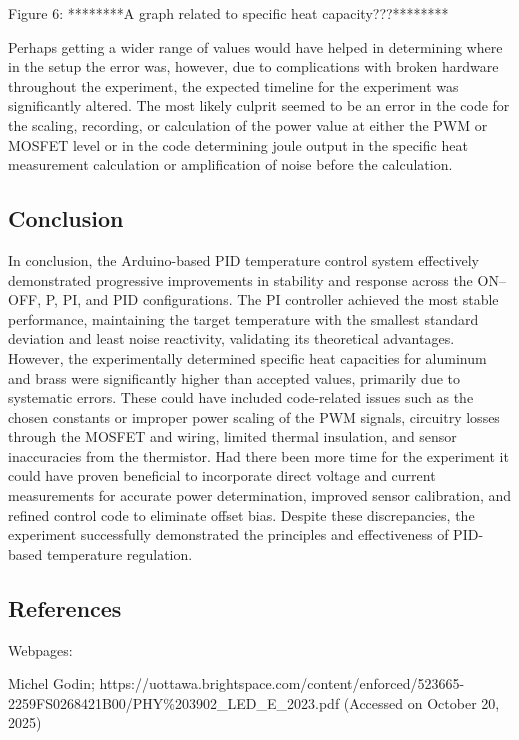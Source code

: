 \documentclass[11pt]{article}
\makeatletter
\newcommand{\boxspacing}{\kern\kvtcb@left@rule\kern\kvtcb@boxsep}
\newcommand{\prompt}[4]{
        {\ttfamily\llap{{\color{#2}[#3]:\hspace{3pt}#4}}\vspace{-\baselineskip}}
    }
\makeatother
\begin{document}
    Figure 6: ********A graph related to specific heat capacity???********

    Perhaps getting a wider range of values would have helped in determining
where in the setup the error was, however, due to complications with
broken hardware throughout the experiment, the expected timeline for the
experiment was significantly altered. The most likely culprit seemed to
be an error in the code for the scaling, recording, or calculation of
the power value at either the PWM or MOSFET level or in the code
determining joule output in the specific heat measurement calculation or
amplification of noise before the calculation.

    \hypertarget{conclusion}{%
\subsection{Conclusion}\label{conclusion}}

    In conclusion, the Arduino-based PID temperature control system
effectively demonstrated progressive improvements in stability and
response across the ON--OFF, P, PI, and PID configurations. The PI
controller achieved the most stable performance, maintaining the target
temperature with the smallest standard deviation and least noise
reactivity, validating its theoretical advantages. However, the
experimentally determined specific heat capacities for aluminum and
brass were significantly higher than accepted values, primarily due to
systematic errors. These could have included code-related issues such as
the chosen constants or improper power scaling of the PWM signals,
circuitry losses through the MOSFET and wiring, limited thermal
insulation, and sensor inaccuracies from the thermistor. Had there been
more time for the experiment it could have proven beneficial to
incorporate direct voltage and current measurements for accurate power
determination, improved sensor calibration, and refined control code to
eliminate offset bias. Despite these discrepancies, the experiment
successfully demonstrated the principles and effectiveness of PID-based
temperature regulation.

    \hypertarget{references}{%
\subsection{References}\label{references}}

    Webpages:

Michel Godin;
https://uottawa.brightspace.com/content/enforced/523665-2259FS0268421B00/PHY\%203902\_LED\_E\_2023.pdf
(Accessed on October 20, 2025)

    \begin{tcolorbox}[breakable, size=fbox, boxrule=1pt, pad at break*=1mm,colback=cellbackground, colframe=cellborder]
\prompt{In}{incolor}{ }{\boxspacing}
\begin{Verbatim}[commandchars=\\\{\}]

\end{Verbatim}
\end{tcolorbox}


    
    
    
\end{document}
